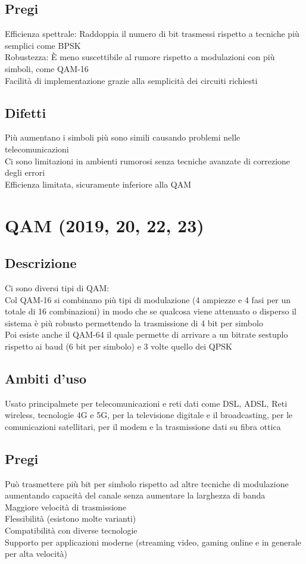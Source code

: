 \documentclass[10pt,oneside,a4paper]{article}
\begin{document}
\subsection{Pregi}
Efficienza spettrale: Raddoppia il numero di bit trasmessi rispetto a tecniche più semplici come BPSK\\
Robustezza: È meno suscettibile al rumore rispetto a modulazioni con più simboli, come QAM-16\\
Facilità di implementazione grazie alla semplicità dei circuiti richiesti\\
\subsection{Difetti}
Più aumentano i simboli più sono simili causando problemi nelle telecomunicazioni\\
Ci sono limitazioni in ambienti rumorosi senza tecniche avanzate di correzione degli errori\\
Efficienza limitata, sicuramente inferiore alla QAM
\section{QAM (2019, 20, 22, 23)}
\subsection{Descrizione}
Ci sono diversi tipi di QAM:\\
Col QAM-16 si combinano più tipi di modulazione (4 ampiezze e 4 fasi per un totale di 16 combinazioni) in modo che se qualcosa viene attenuato o disperso il sistema è più robusto permettendo la trasmissione di 4 bit per simbolo\\
Poi esiste anche il QAM-64 il quale permette di arrivare a un bitrate sestuplo rispetto ai baud (6 bit per simbolo) e 3 volte quello dei QPSK
\subsection{Ambiti d'uso}
Usato principalmete per telecomunicazioni e reti dati come DSL, ADSL, Reti wireless, tecnologie 4G e 5G, per la televisione digitale e il broadcasting, per le comunicazioni satellitari, per il modem e la trasmissione dati su fibra ottica
\subsection{Pregi}
Può trasmettere più bit per simbolo rispetto ad altre tecniche di modulazione aumentando capacità del canale senza aumentare la larghezza di banda\\
Maggiore velocità di trasmissione\\
Flessibilità (esistono molte varianti)\\
Compatibilità con diverse tecnologie\\
Supporto per applicazioni moderne (streaming video, gaming online e in generale per alta velocità)
\end{document}
